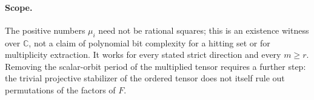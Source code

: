 \paragraph{Scope.}
The positive numbers $\mu_i$ need not be rational squares;
this is an existence witness over $\mathbb C$, not a claim
of polynomial bit complexity for a hitting set or for
multiplicity extraction. It works for every stated strict
direction and every $m\ge r$. Removing the scalar-orbit
period of the multiplied tensor requires a further step:
the trivial projective stabilizer of the ordered tensor
does not itself rule out permutations of the factors of $F$.

